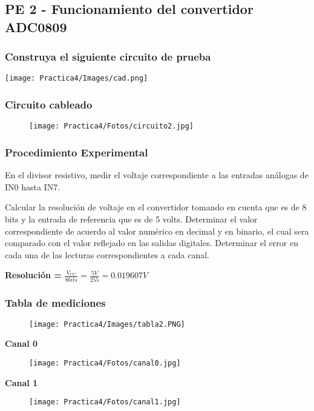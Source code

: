 \documentclass[12pt]{article}
\begin{document}
	\subsection{PE 2 - Funcionamiento del convertidor ADC0809 }
	\subsubsection{Construya el siguiente circuito de prueba}
	\texttt{[image: Practica4/Images/cad.png]}
	\subsubsection{Circuito cableado}
	\begin{figure}[h!]
                \centering
                \texttt{[image: Practica4/Fotos/circuito2.jpg]}
    \end{figure}
	\subsubsection{Procedimiento Experimental}
	En el divisor resistivo, medir el voltaje correspondiente a las entradas análogas de IN0 hasta IN7. 
	
	Calcular la resolución de voltaje en el convertidor tomando en cuenta que es de 8 bits y la entrada de referencia que es de 5 volts. Determinar el valor correspondiente de acuerdo al valor numérico en decimal y en binario, el cual sera comparado con el valor reflejado en las salidas digitales. Determinar el error en cada una de las lecturas correspondientes a cada canal.
	
	\textbf{Resolución = } $\frac{V_{CC}}{8 bits} = \frac{5 V}{255} = 0.019607 V$ 
	
	\newpage
	\subsubsection{Tabla de mediciones}
	\begin{figure}[h!]
                \centering
                \texttt{[image: Practica4/Images/tabla2.PNG]}
    \end{figure}
    
    \textbf{Canal 0}
    \begin{figure}[h!]
                \centering
                \texttt{[image: Practica4/Fotos/canal0.jpg]}
    \end{figure}
    \newpage
    \textbf{Canal 1}
    \begin{figure}[h!]
                \centering
                \texttt{[image: Practica4/Fotos/canal1.jpg]}
    \end{figure}
    
\end{document}
